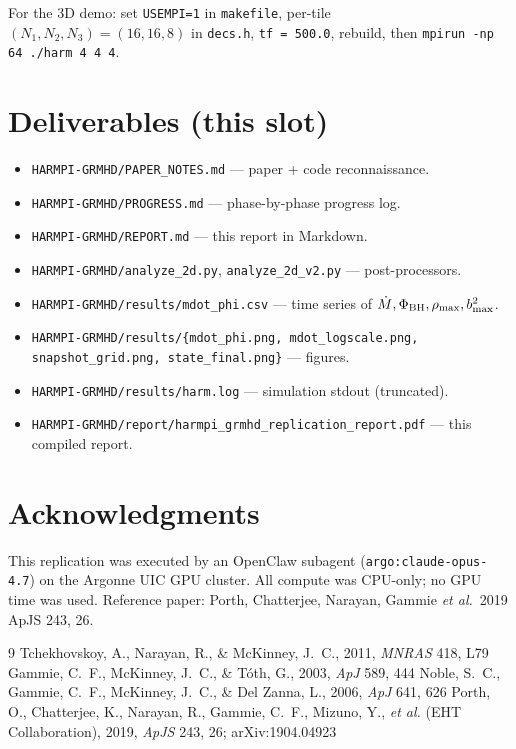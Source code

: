 \documentclass[11pt]{article}
\begin{document}
For the 3D demo: set \verb|USEMPI=1| in \texttt{makefile}, per-tile $(N_1,N_2,N_3) =
(16,16,8)$ in \texttt{decs.h}, \verb|tf = 500.0|, rebuild, then
\verb|mpirun -np 64 ./harm 4 4 4|.

\section{Deliverables (this slot)}

\begin{itemize}
\item \texttt{HARMPI-GRMHD/PAPER\_NOTES.md} --- paper + code reconnaissance.
\item \texttt{HARMPI-GRMHD/PROGRESS.md}    --- phase-by-phase progress log.
\item \texttt{HARMPI-GRMHD/REPORT.md}       --- this report in Markdown.
\item \texttt{HARMPI-GRMHD/analyze\_2d.py}, \texttt{analyze\_2d\_v2.py} --- post-processors.
\item \texttt{HARMPI-GRMHD/results/mdot\_phi.csv} --- time series of $\dot M, \Phi_{\rm BH}, \rho_{\max}, b^2_{\max}$.
\item \texttt{HARMPI-GRMHD/results/\{mdot\_phi.png, mdot\_logscale.png, snapshot\_grid.png, state\_final.png\}} --- figures.
\item \texttt{HARMPI-GRMHD/results/harm.log} --- simulation stdout (truncated).
\item \texttt{HARMPI-GRMHD/report/harmpi\_grmhd\_replication\_report.pdf} --- this compiled report.
\end{itemize}

\section*{Acknowledgments}

This replication was executed by an OpenClaw subagent (\texttt{argo:claude-opus-4.7}) on
the Argonne UIC GPU cluster. All compute was CPU-only; no GPU time was used.
Reference paper: Porth, Chatterjee, Narayan, Gammie \emph{et al.}\ 2019 ApJS 243, 26.

\begin{thebibliography}{9}
Tchekhovskoy, A., Narayan, R., \& McKinney, J.~C., 2011, \emph{MNRAS} 418, L79
Gammie, C.~F., McKinney, J.~C., \& T\'oth, G., 2003, \emph{ApJ} 589, 444
Noble, S.~C., Gammie, C.~F., McKinney, J.~C., \& Del Zanna, L., 2006, \emph{ApJ} 641, 626
Porth, O., Chatterjee, K., Narayan, R., Gammie, C.~F., Mizuno, Y., \emph{et al.}
(EHT Collaboration), 2019, \emph{ApJS} 243, 26; arXiv:1904.04923
\end{thebibliography}
\end{document}
